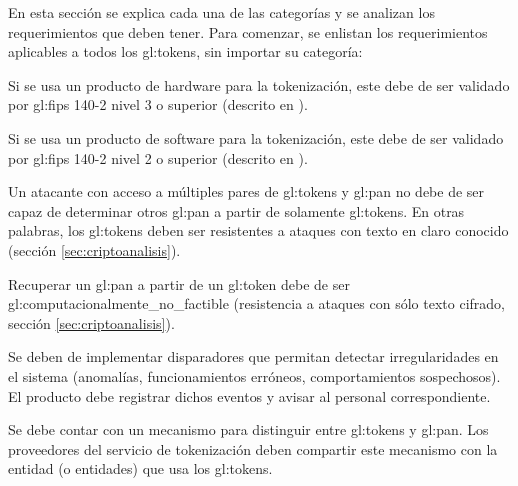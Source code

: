 En esta sección se explica cada una de las categorías y se analizan los
requerimientos que deben tener. Para comenzar, se enlistan los requerimientos
aplicables a todos los \glspl{gl:token}, sin importar su categoría:

{
  Si se usa un producto de hardware para la tokenización, este debe de ser
  validado por \gls{gl:fips} 140-2 nivel 3 o superior (descrito en
  \cite{nist_modulos_criptograficos}).
}

{
  Si se usa un producto de software para la tokenización, este debe de ser
  validado por \gls{gl:fips} 140-2 nivel 2 o superior (descrito en
  \cite{nist_modulos_criptograficos}).
}

{
  Un atacante con acceso a múltiples pares de \glspl{gl:token} y
  \gls{gl:pan} no debe de ser capaz de determinar otros \gls{gl:pan} a partir
  de solamente \glspl{gl:token}. En otras palabras, los \glspl{gl:token}
  deben ser resistentes a ataques con texto en claro conocido (sección
  \ref{sec:criptoanalisis}).
}

{
  Recuperar un \gls{gl:pan} a partir de un \gls{gl:token} debe de ser
  \gls{gl:computacionalmente_no_factible} (resistencia a ataques con sólo
  texto cifrado, sección \ref{sec:criptoanalisis}).
}

{
  Se deben de implementar disparadores que permitan detectar
  irregularidades en el sistema (anomalías, funcionamientos erróneos,
  comportamientos sospechosos). El producto debe registrar dichos eventos y
  avisar al personal correspondiente.
}

{
  Se debe contar con un mecanismo para distinguir entre \glspl{gl:token}
  y \gls{gl:pan}. Los proveedores del servicio de tokenización deben
  compartir este mecanismo con la entidad (o entidades) que usa los
  \glspl{gl:token}.
}

